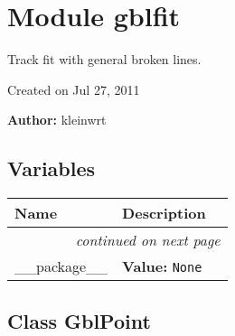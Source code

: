 %
%
%


\section{Module gblfit}

    \label{gblfit}
Track fit with general broken lines.

Created on Jul 27, 2011

\textbf{Author:} kleinwrt





  \subsection{Variables}

    \vspace{-1cm}
\hspace{\varindent}\begin{longtable}{|p{\varnamewidth}|p{\vardescrwidth}|l}
\cline{1-2}
\cline{1-2} \centering \textbf{Name} & \centering \textbf{Description}& \\
\cline{1-2}
\endhead\cline{1-2}\multicolumn{3}{r}{\small\textit{continued on next page}}\\\endfoot\cline{1-2}
\endlastfoot\raggedright \_\-\_\-p\-a\-c\-k\-a\-g\-e\-\_\-\_\- & \raggedright \textbf{Value:} 
{\tt None}&\\
\cline{1-2}
\end{longtable}



\subsection{Class GblPoint}

